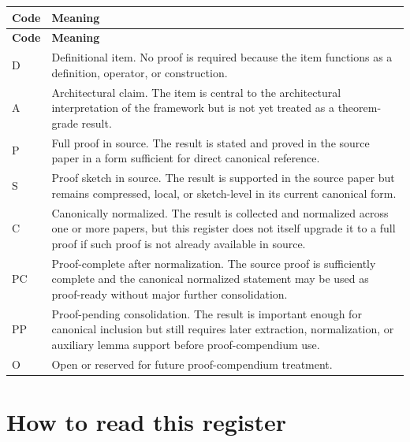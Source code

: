 \documentclass[12pt]{article}
\begin{document}
	\begin{longtable}{>{\RaggedRight\arraybackslash}p{}
			>{\RaggedRight\arraybackslash}p{}}
		\toprule
		\textbf{Code} & \textbf{Meaning} \\
		\midrule
		\endfirsthead
		\toprule
		\textbf{Code} & \textbf{Meaning} \\
		\midrule
		\endhead
		
		D & Definitional item. No proof is required because the item functions as a definition, operator, or construction. \\
		
		A & Architectural claim. The item is central to the architectural interpretation of the framework but is not yet treated as a theorem-grade result. \\
		
		P & Full proof in source. The result is stated and proved in the source paper in a form sufficient for direct canonical reference. \\
		
		S & Proof sketch in source. The result is supported in the source paper but remains compressed, local, or sketch-level in its current canonical form. \\
		
		C & Canonically normalized. The result is collected and normalized across one or more papers, but this register does not itself upgrade it to a full proof if such proof is not already available in source. \\
		
		PC & Proof-complete after normalization. The source proof is sufficiently complete and the canonical normalized statement may be used as proof-ready without major further consolidation. \\
		
		PP & Proof-pending consolidation. The result is important enough for canonical inclusion but still requires later extraction, normalization, or auxiliary lemma support before proof-compendium use. \\
		
		O & Open or reserved for future proof-compendium treatment. \\
		
		\bottomrule
	\end{longtable}
	
	\section{How to read this register}
	
\end{document}
